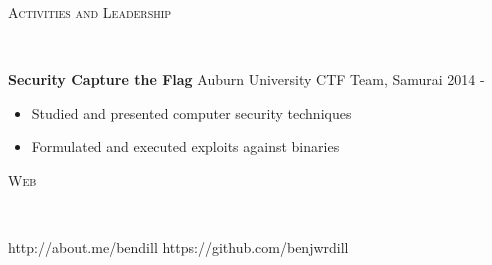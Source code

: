 \documentclass[9pt]{article}
\newenvironment{changemargin}[2]{%
  \begin{list}{}{%
    \setlength{\topsep}{0pt}%
    \setlength{\leftmargin}{#1}%
    \setlength{\rightmargin}{#2}%
    \setlength{\listparindent}{\parindent}%
    \setlength{\itemindent}{\parindent}%
    \setlength{\parsep}{\parskip}%
  }%
  \item[]}{\end{list}
}
\newcommand{\lineover}{
	\begin{changemargin}{-0.05in}{-0.05in}
		\vspace*{-8pt}
		\hrulefill \\
		\vspace*{-2pt}
	\end{changemargin}
}
\newcommand{\header}[1]{
	\begin{changemargin}{-0.5in}{-0.5in}
		\scshape{#1}\\
  	\lineover
	\end{changemargin}
}
\newenvironment{body} {
	\vspace*{-16pt}
	\begin{changemargin}{-0.25in}{-0.5in}
  }	
	{\end{changemargin}
}
\begin{document}
\smallskip



%



%
%


\header{Activities and Leadership}

\begin{body}
	\vspace{17pt}
\textbf{Security Capture the Flag} Auburn University CTF Team, Samurai  \hfill{} 2014 - \\
	\vspace{-4pt}
	\begin{itemize} \itemsep -0pt
		\item{Studied and presented computer security techniques}
		\item{Formulated and executed exploits against binaries}
	\end{itemize}	

\end{body}

\smallskip


\header{Web}

\begin{body}
	\vspace{17pt}
	http://about.me/bendill \hfill{} https://github.com/benjwrdill \\
\end{body}
\end{document}
